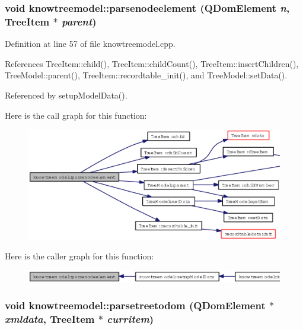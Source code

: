 \subsubsection{\setlength{\rightskip}{0pt plus 5cm}void knowtreemodel::parsenodeelement (QDom\-Element {\em n}, {\bf Tree\-Item} $\ast$ {\em parent})\hspace{0.3cm}{\tt  [private]}}\label{classknowtreemodel_01a2b1a9a1edc6b25210a27a6cca5a7c}




Definition at line 57 of file knowtreemodel.cpp.

References Tree\-Item::child(), Tree\-Item::child\-Count(), Tree\-Item::insert\-Children(), Tree\-Model::parent(), Tree\-Item::recordtable\_\-init(), and Tree\-Model::set\-Data().

Referenced by setup\-Model\-Data().

Here is the call graph for this function:\begin{figure}[H]
\begin{center}
\leavevmode
\includegraphics[width=367pt]{classknowtreemodel_01a2b1a9a1edc6b25210a27a6cca5a7c_cgraph}
\end{center}
\end{figure}


Here is the caller graph for this function:\begin{figure}[H]
\begin{center}
\leavevmode
\includegraphics[width=340pt]{classknowtreemodel_01a2b1a9a1edc6b25210a27a6cca5a7c_icgraph}
\end{center}
\end{figure}
\subsubsection{\setlength{\rightskip}{0pt plus 5cm}void knowtreemodel::parsetreetodom (QDom\-Element $\ast$ {\em xmldata}, {\bf Tree\-Item} $\ast$ {\em curritem})\hspace{0.3cm}{\tt  [private]}}\label{classknowtreemodel_f0f1bf490bdc9687d25d72b966020cd8}




